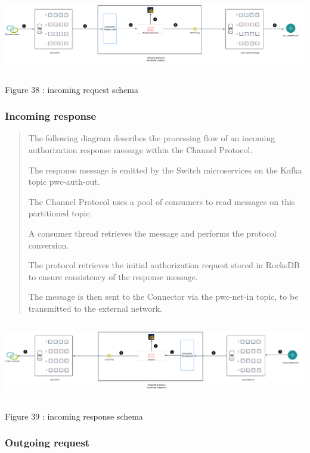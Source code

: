 \documentclass[12pt,a4paper]{report}
\begin{document}
\includegraphics[width=6.95121in,height=1.35379in]{vertopal_d1b0b2209edd4c6aa8254f57daa0953b/media/image57.png}

\protect\hypertarget{_Toc201954514}{}{}Figure 38 : incoming request
schema

\hypertarget{incoming-response-1}{%
\subsubsection{\texorpdfstring{\textbf{Incoming
response}}{Incoming response}}\label{incoming-response-1}}

\begin{quote}
The following diagram describes the processing flow of an incoming
authorization response message within the Channel Protocol.

The response message is emitted by the Switch microservices on the Kafka
topic pwc-auth-out.

The Channel Protocol uses a pool of consumers to read messages on this
partitioned topic.

A consumer thread retrieves the message and performs the protocol
conversion.

The protocol retrieves the initial authorization request stored in
RocksDB to ensure consistency of the response message.

The message is then sent to the Connector via the pwc-net-in topic, to
be transmitted to the external network.
\end{quote}

\includegraphics[width=6.82134in,height=1.33791in]{vertopal_d1b0b2209edd4c6aa8254f57daa0953b/media/image58.png}

\protect\hypertarget{_Toc201954515}{}{}Figure 39 : incoming response
schema

\hypertarget{outgoing-request-1}{%
\subsubsection{\texorpdfstring{\textbf{Outgoing
request}}{Outgoing request}}\label{outgoing-request-1}}
\end{document}
